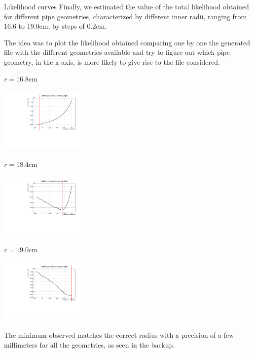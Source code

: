 \documentclass[handout,8 pt]{beamer}
\begin{document}
\begin{frame}{Likelihood curves}
\justifying
Finally, we estimated the value of the total likelihood obtained for different pipe geometries, characterized by different inner radii, ranging from 16.6 to 19.0cm, by steps of 0.2cm. \vfill

The idea was to plot the likelihood obtained comparing one by one the generated file with the different geometries available and try to figure out which pipe geometry, in the x-axis, is more likely to give rise to the file considered. \vfill

\begin{minipage}[c]{.32\textwidth}
\begin{exampleblock}{} \begin{center}$r = 16.8$cm\end{center} \end{exampleblock}
\includegraphics[width=4.2cm, height=3.2cm]{figs/likelihood100HighStat/likelihood16p8.pdf} 
\end{minipage}
\begin{minipage}[c]{.32\textwidth}
\begin{exampleblock}{} \begin{center}$r = 18.4$cm\end{center} \end{exampleblock}
\includegraphics[width=4.2cm, height=3.2cm]{figs/likelihood100HighStat/likelihood18p4.pdf} 
\end{minipage}
\begin{minipage}[c]{.32\textwidth}
\begin{exampleblock}{} \begin{center}$r = 19.0$cm\end{center} \end{exampleblock}
\includegraphics[width=4.2cm, height=3.2cm]{figs/likelihood100HighStat/likelihood19p0.pdf} 
\end{minipage} \vfill

The minimum observed matches the correct radius with a precision of a few millimeters for all the geometries, as seen in the backup. \vfill
\end{frame}
\end{document}
